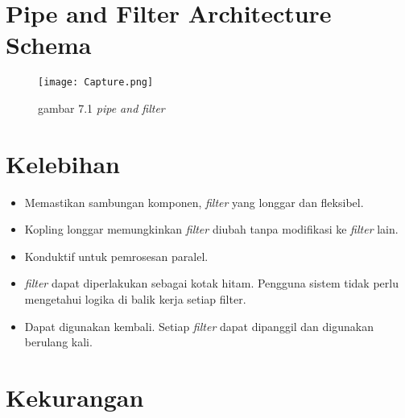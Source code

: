 	
	\section{Pipe and Filter Architecture Schema
	}
		\begin{figure}[h] 
		\begin{center} 
			\renewcommand{\figurename}{Gambar} 
			\texttt{[image: Capture.png]} 
			\caption{gambar 7.1 \textit{pipe and filter}} 
			\label{gambar} 
		\end{center} 
	\end{figure}
	
	\section{Kelebihan}
	
	\begin{itemize}
		\item Memastikan sambungan komponen, \textit{filter} yang longgar dan fleksibel.
		\item Kopling longgar memungkinkan \textit{filter} diubah tanpa modifikasi ke \textit{filter} lain.
		\item Konduktif untuk pemrosesan paralel.
		\item\textit{filter} dapat diperlakukan sebagai kotak hitam. Pengguna sistem tidak perlu mengetahui logika di balik kerja setiap filter.
		\item Dapat digunakan kembali. Setiap \textit{filter} dapat dipanggil dan digunakan berulang kali.
	\end{itemize}
	
	
	\section{Kekurangan}
	

